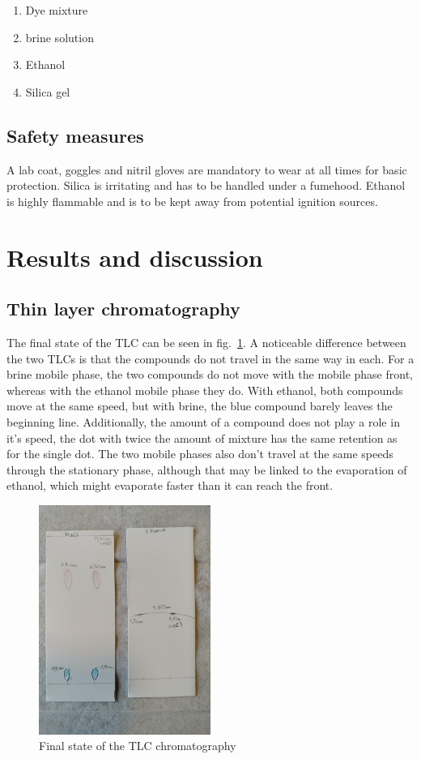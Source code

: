 \documentclass{article}
\begin{document}
\begin{enumerate}
    \item Dye mixture
    \item brine solution
    \item Ethanol
    \item Silica gel
\end{enumerate}

\subsection{Safety measures}
A lab coat, goggles and nitril gloves are mandatory to wear at all times for basic protection. Silica is irritating and has to be handled under a fumehood. Ethanol is highly flammable and is to be kept away from potential ignition sources.

\section{Results and discussion}

\subsection{Thin layer chromatography}

The final state of the TLC can be seen in fig.~\ref{fig:resultTLC}. A noticeable difference between the two TLCs is that the compounds do not travel in the same way in each. For a brine mobile phase, the two compounds do not move with the mobile phase front, whereas with the ethanol mobile phase they do. With ethanol, both compounds move at the same speed, but with brine, the blue compound barely leaves the beginning line. Additionally, the amount of a compound does not play a role in it's speed, the dot with twice the amount of mixture has the same retention as for the single dot. The two mobile phases also don't travel at the same speeds through the stationary phase, although that may be linked to the evaporation of ethanol, which might evaporate faster than it can reach the front.


\begin{figure}[!ht]
    \centering
    \includegraphics[width=0.5\textwidth,angle=-90]{Pictures/TLCanotated.jpg}
    \caption{Final state of the TLC chromatography}
    \label{fig:resultTLC}
\end{figure}
\FloatBarrier
\end{document}
